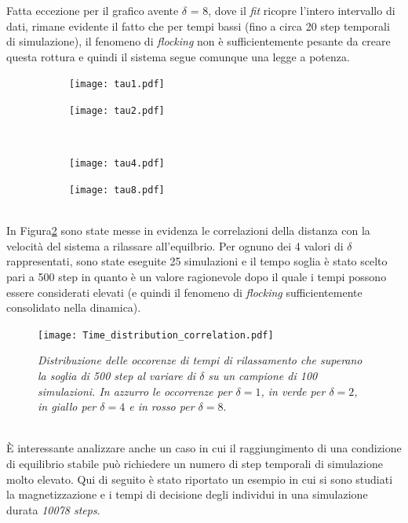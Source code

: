 \documentclass[letterpaper,10pt]{article}
\begin{document}
Fatta eccezione per il grafico avente $\delta$ = 8, dove il \textit{fit} ricopre l'intero intervallo di dati, rimane evidente il fatto che per tempi bassi (fino a circa 20 step temporali di simulazione), il fenomeno di \textit{flocking} non è sufficientemente pesante da creare questa rottura e quindi il sistema segue comunque una legge a potenza.\\
\begin{figure}[h]
\centering
\begin{subfigure}{\textwidth}
\texttt{[image: tau1.pdf]}
\end{subfigure}
\begin{subfigure}{\textwidth}
\texttt{[image: tau2.pdf]}
\end{subfigure}
\end{figure}\\
\begin{figure}
\ContinuedFloat
\centering
\begin{subfigure}{\textwidth}
\texttt{[image: tau4.pdf]}
\end{subfigure}
\begin{subfigure}{\textwidth}
\texttt{[image: tau8.pdf]}
\end{subfigure}
\label{Fig:17}
\end{figure}
\[\]
\\In Figura\ref{Fig:123} sono state messe in evidenza le correlazioni della distanza con la velocità del sistema a rilassare all'equilbrio. Per ognuno dei 4 valori di $\delta$ rappresentati, sono state eseguite 25 simulazioni e il tempo soglia è stato scelto pari a 500 step in quanto è un valore ragionevole dopo il quale i tempi possono essere considerati elevati (e quindi il fenomeno di \textit{flocking} sufficientemente consolidato nella dinamica).
\\
\begin{figure}[h!!]
\centering
\texttt{[image: Time\_distribution\_correlation.pdf]}
\caption{\textit{Distribuzione delle occorenze di tempi di rilassamento che superano la soglia di 500 step al variare di $\delta$ su un campione di 100 simulazioni. In azzurro le occorrenze per $\delta=1$, in verde per $\delta=2$, in giallo per $\delta=4$ e in rosso per $\delta=8$}.}
\label{Fig:123}
\end{figure}
\\
È interessante analizzare anche un caso in cui il raggiungimento di una condizione di equilibrio stabile può richiedere un numero di step temporali di simulazione molto elevato. Qui di seguito è stato riportato un esempio in cui si sono studiati la magnetizzazione
e i tempi di decisione degli individui in una simulazione durata \textit{10078 steps}.
\end{document}
